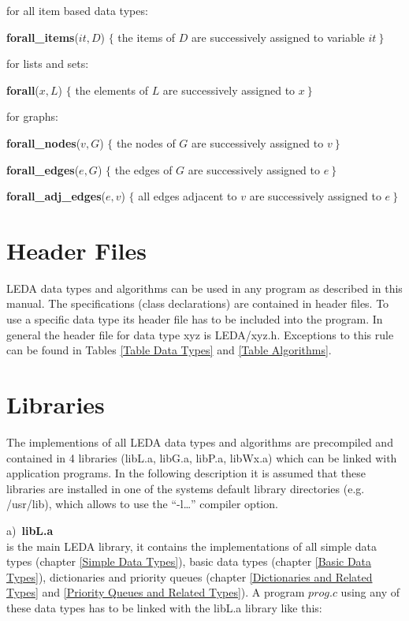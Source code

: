 for all item based data types:

\smallskip
{\bf forall\_items}($it,D$) 
$\{$ the items of $D$ are successively assigned to variable $it\ \}$

\smallskip
for lists and sets:

\smallskip
{\bf forall}($x,L$) $\{$ the elements of $L$ are successively assigned to $x\ \}$

\smallskip
for graphs:

\smallskip
{\bf forall\_nodes}($v,G$) $\{$ the nodes of $G$ are successively
assigned to $v\ \}$

\smallskip
{\bf forall\_edges}($e,G$) $\{$ the edges of $G$ are successively
assigned to $e\ \}$

\smallskip
{\bf forall\_adj\_edges}($e,v$) $\{$ all edges adjacent to $v$ are
successively assigned to $e\ \}$


\section{Header Files}

\label{Header Files}
LEDA data types and algorithms can be used in any \CC program as described 
in this manual. The specifications (class declarations) are contained
in header files. To use a specific data type its header file has to be 
included into the program. In general the header file for data type xyz is 
\<LEDA/xyz.h\>. Exceptions to this rule can be found in Tables 
\ref{Table Data Types} and \ref{Table Algorithms}.


\section{Libraries}

\label{Libraries}
The implementions of all LEDA data types and algorithms are precompiled and 
contained in 4 libraries (libL.a, libG.a, libP.a, libWx.a) 
which can be linked with \CC application programs. In the following
description it is assumed that these libraries are installed in one of the 
systems default library directories (e.g. /usr/lib), which allows to use 
the ``-l\dots'' compiler option.

a)\ {\bf libL.a}\\
is the main LEDA library, it contains the implementations of all simple 
data types (chapter \ref{Simple Data Types}), basic data types 
(chapter \ref{Basic Data Types}), dictionaries and priority
queues (chapter \ref{Dictionaries and Related Types} and 
\ref{Priority Queues and Related Types}). A program 
$prog.c$ using any of these data types has to be
linked with the libL.a library like this:


